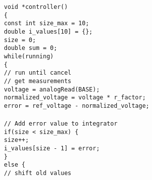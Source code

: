 \documentclass[a4paper, 12pt]{article}
\begin{document}
\begin{appendices}
        \texttt{void *controller()} \\\noindent
        \texttt{\{ \\\noindent}
	\texttt{\hspace*{1em}const int size\_max = 10;} \\\noindent
	\texttt{\hspace*{1em}double i\_values[10] = \{\};} \\\noindent
	\texttt{\hspace*{1em}size = 0;} \\\noindent
	\texttt{\hspace*{1em}double sum = 0;} \\\noindent
	\texttt{\hspace*{1em}while(running)} \\\noindent
	\texttt{\hspace*{2em}\{ \\\noindent}
	\texttt{\hspace*{2em}// run until cancel} \\\noindent
	\texttt{\hspace*{2em}// get measurements} \\\noindent
	\texttt{\hspace*{2em}voltage = analogRead(BASE);} \\\noindent
	\texttt{\hspace*{2em}normalized\_voltage = voltage * r\_factor;} \\\noindent
	\texttt{\hspace*{2em}error = ref\_voltage - normalized\_voltage;} \\\noindent
	\texttt{\hspace*{2em}\\\noindent}
	\texttt{\hspace*{2em}// Add error value to integrator} \\\noindent
	\texttt{\hspace*{2em}if(size < size\_max) \{ \\\noindent}
	\texttt{\hspace*{3em}size++;} \\\noindent
	\texttt{\hspace*{3em}i\_values[size - 1] = error;} \\\noindent
	\texttt{\hspace*{2em}\}} \\\noindent
	\texttt{\hspace*{2em}else \{ \\\noindent}
	\texttt{\hspace*{3em}// shift old values} \\\noindent

\end{appendices}
\end{document}
